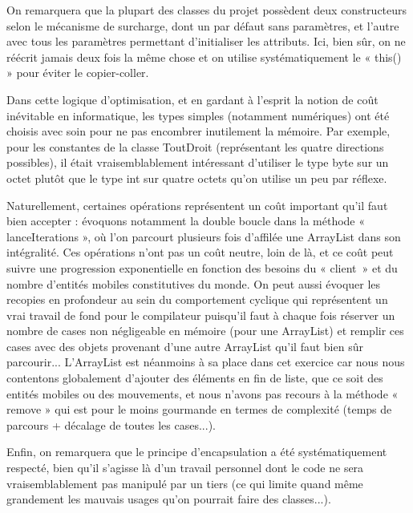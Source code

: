 \documentclass[a4paper,10pt]{report}
\begin{document}
On remarquera que la plupart des classes du projet possèdent deux constructeurs selon le mécanisme de surcharge, dont un par défaut sans paramètres, et l'autre avec tous les paramètres permettant d'initialiser les attributs. Ici, bien sûr, on ne réécrit jamais deux fois la même chose et on utilise systématiquement le « this() » pour éviter le copier-coller.

Dans cette logique d'optimisation, et en gardant à l'esprit la notion de coût inévitable en informatique, les types simples (notamment numériques) ont été choisis avec soin pour ne pas encombrer inutilement la mémoire. Par exemple, pour les constantes de la classe ToutDroit (représentant les quatre directions possibles), il était vraisemblablement intéressant d'utiliser le type byte sur un octet plutôt que le type int sur quatre octets qu'on utilise un peu par réflexe.

Naturellement, certaines opérations représentent un coût important qu'il faut bien accepter : évoquons notamment la double boucle dans la méthode « lanceIterations », où l'on parcourt plusieurs fois d'affilée une ArrayList dans son intégralité. Ces opérations n'ont pas un coût neutre, loin de là, et ce coût peut suivre une progression exponentielle en fonction des besoins du « client~» et du nombre d'entités mobiles constitutives du monde. On peut aussi évoquer les recopies en profondeur au sein du comportement cyclique qui représentent un vrai travail de fond pour le compilateur puisqu'il faut à chaque fois réserver un nombre de cases non négligeable en mémoire (pour une ArrayList) et remplir ces cases avec des objets provenant d'une autre ArrayList qu'il faut bien sûr parcourir... L'ArrayList est néanmoins à sa place dans cet exercice car nous nous contentons globalement d'ajouter des éléments en fin de liste, que ce soit des entités mobiles ou des mouvements, et nous n'avons pas recours à la méthode « remove » qui est pour le moins gourmande en termes de complexité (temps de parcours + décalage de toutes les cases...).

Enfin, on remarquera que le principe d'encapsulation a été systématiquement respecté, bien qu'il s'agisse là d'un travail personnel dont le code ne sera vraisemblablement pas manipulé par un tiers (ce qui limite quand même grandement les mauvais usages qu'on pourrait faire des classes...).
\end{document}
